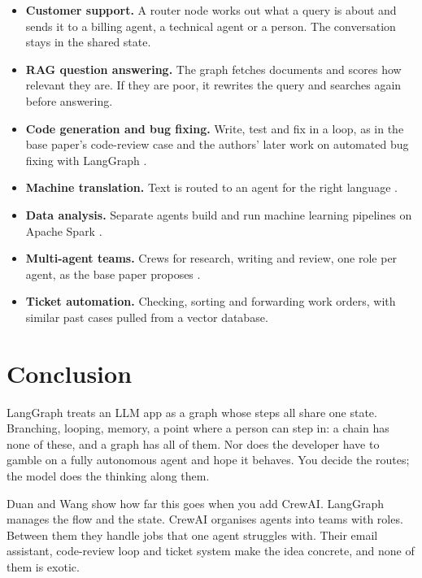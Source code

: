 \documentclass[12pt,a4paper]{report}
\begin{document}
\begin{itemize}
    \item \textbf{Customer support.} A router node works out what a query is about and sends it to a billing agent, a technical agent or a person. The conversation stays in the shared state.
    \item \textbf{RAG question answering.} The graph fetches documents and scores how relevant they are. If they are poor, it rewrites the query and searches again before answering.
    \item \textbf{Code generation and bug fixing.} Write, test and fix in a loop, as in the base paper's code-review case and the authors' later work on automated bug fixing with LangGraph \cite{wang2025bugfix}.
    \item \textbf{Machine translation.} Text is routed to an agent for the right language \cite{wang2024translation}.
    \item \textbf{Data analysis.} Separate agents build and run machine learning pipelines on Apache Spark \cite{wang2024spark}.
    \item \textbf{Multi-agent teams.} Crews for research, writing and review, one role per agent, as the base paper proposes \cite{duan2024langgraphcrewai}.
    \item \textbf{Ticket automation.} Checking, sorting and forwarding work orders, with similar past cases pulled from a vector database.
\end{itemize}

\chapter{Conclusion}

LangGraph treats an LLM app as a graph whose steps all share one state. Branching, looping, memory, a point where a person can step in: a chain has none of these, and a graph has all of them. Nor does the developer have to gamble on a fully autonomous agent and hope it behaves. You decide the routes; the model does the thinking along them.

Duan and Wang show how far this goes when you add CrewAI. LangGraph manages the flow and the state. CrewAI organises agents into teams with roles. Between them they handle jobs that one agent struggles with. Their email assistant, code-review loop and ticket system make the idea concrete, and none of them is exotic.
\end{document}
